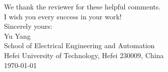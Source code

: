 \documentclass[10pt,fleqn]{article}
\begin{document}
We thank the reviewer for these helpful comments.\\

I wish you every success in your work!\\

Sincerely yours:
\\

\indent Yu Yang\\

School of Electrical Engineering and Automation\\

Hefei University of Technology, Hefei 230009, China\\

\indent \today
\end{document}
